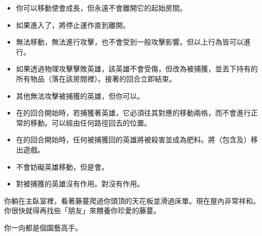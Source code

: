 \vspace*{-1em}
\begin{itemize}
	\item 你可以移動使會成長，但永遠不會離開它的起始房間。
	\item 如果進入了，將停止運作直到離開。
\end{itemize}

\vspace*{-1em}
\begin{itemize}
	\item {}無法移動，無法進行攻擊，也不會受到一般攻擊影響。但以上行為皆可以進行。
	\item 如果透過物理攻擊擊敗英雄，該英雄不會受傷，但改為被捕獲，並丟下持有的所有物品（落在該房間裡）。接著的回合立即結束。
	\item 其他無法攻擊被捕獲的英雄，但你可以。
	\item 在的回合開始時，若捕獲著英雄，它必須往其對應的移動兩格，而不會進行正常的移動。可以經由任何路徑回去的位置。
	\item 在的回合開始時，任何被捕獲回的英雄將被殺害並成為肥料。將（包含及）移出遊戲。
	\item {}不會妨礙英雄移動，但是會。
	\item {}對被捕獲的英雄沒有作用。對沒有作用。
\end{itemize}

\begin{HauntStory}
	你躺在主臥室裡，看著藤蔓爬過你頭頂的天花板並滑過床單。現在屋內非常祥和。你很快就得再找些「朋友」來餵養你珍愛的藤蔓。

	你一向都是個園藝高手。
\end{HauntStory}
